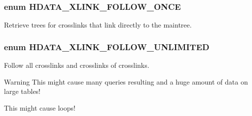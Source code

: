 \subsubsection[{HDATA\_\-XLINK\_\-FOLLOW\_\-ONCE}]{\setlength{\rightskip}{0pt plus 5cm}enum {\bf HDATA\_\-XLINK\_\-FOLLOW\_\-ONCE}}\label{group__HDATA__FollowXLink_gab45af51ca6c938ae4d0e419121e79d8e}


Retrieve trees for crosslinks that link directly to the maintree. 

\subsubsection[{HDATA\_\-XLINK\_\-FOLLOW\_\-UNLIMITED}]{\setlength{\rightskip}{0pt plus 5cm}enum {\bf HDATA\_\-XLINK\_\-FOLLOW\_\-UNLIMITED}}\label{group__HDATA__FollowXLink_ga43ea68a13a3004ff23d10c1e28fb166e}
Follow all crosslinks and crosslinks of crosslinks. \begin{DoxyWarning}{Warning}
This might cause many queries resulting and a huge amount of data on large tables! 

This might cause loops! 
\end{DoxyWarning}
